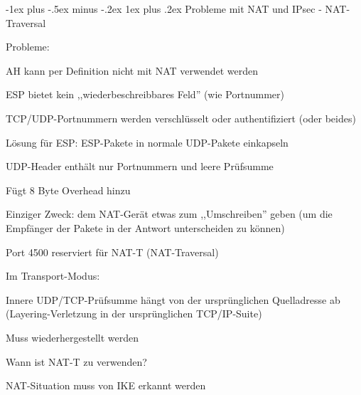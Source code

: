 \documentclass[a4paper]{article}
\makeatletter
\renewcommand{\subsubsection}{\@startsection{subsubsection}{3}{0mm}%
 {-1ex plus -.5ex minus -.2ex}%
 {1ex plus .2ex}%
 {\normalfont\small\bfseries}}
\makeatother
\begin{document}
\begin{multicols}{3}
\begin{itemize*}
            \subsubsection{Probleme mit NAT und IPsec - NAT-Traversal}
            \begin{itemize*}
                  \item Probleme:
                  \begin{itemize*}
                        \item AH kann per Definition nicht mit NAT verwendet werden
                        \item ESP bietet kein ,,wiederbeschreibbares Feld'' (wie Portnummer)
                        \item TCP/UDP-Portnummern werden verschlüsselt oder authentifiziert (oder beides)
                  \end{itemize*}
                  \item Lösung für ESP: ESP-Pakete in normale UDP-Pakete einkapseln
                  \item UDP-Header enthält nur Portnummern und leere Prüfsumme
                  \begin{itemize*}
                        \item Fügt 8 Byte Overhead hinzu
                        \item Einziger Zweck: dem NAT-Gerät etwas zum ,,Umschreiben'' geben (um die Empfänger der Pakete in der Antwort unterscheiden zu können)
                        \item Port 4500 reserviert für NAT-T (NAT-Traversal)
                  \end{itemize*}
                  \item Im Transport-Modus:
                  \begin{itemize*}
                        \item Innere UDP/TCP-Prüfsumme hängt von der ursprünglichen Quelladresse ab (Layering-Verletzung in der ursprünglichen TCP/IP-Suite)
                        \item Muss wiederhergestellt werden
                  \end{itemize*}
                  \item Wann ist NAT-T zu verwenden?
                  \begin{itemize*}
                        \item NAT-Situation muss von IKE erkannt werden

\end{itemize*}
\end{itemize*}
\end{itemize*}
\end{multicols}
\end{document}

